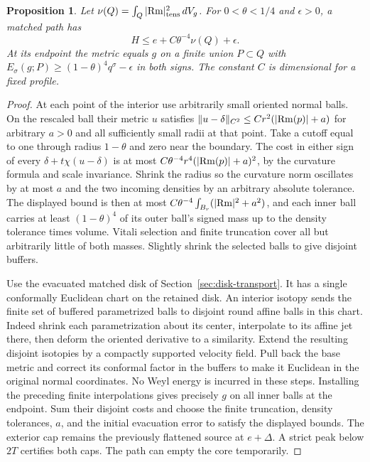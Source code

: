 \documentclass[11pt,letterpaper]{article}
\numberwithin{equation}{section}
\newtheorem{proposition}{Proposition}[section]
\begin{document}
\begin{proposition}\label{prop:core-subballs}
Let \(\nu(Q)=\int_Q|{\rm Rm}|^2_{\rm tens}\,dV_g\).
For \(0<\theta<1/4\) and \(\epsilon>0\), a matched path has
\[
 H\le e+C\theta^{-4}\nu(Q)+\epsilon .
\]
At its endpoint the metric equals \(g\) on a finite union
\(P\subset Q\) with \(E_\sigma(g;P)\ge(1-\theta)^4q^\sigma-\epsilon\)
in both signs. The constant \(C\) is dimensional for a fixed profile.
\end{proposition}
\begin{proof}
At each point of the interior use arbitrarily small oriented normal
balls. On the rescaled ball their metric \(u\)
satisfies \(\|u-\delta\|_{C^2}\le C r^2(|{\rm Rm}(p)|+a)\) for
arbitrary \(a>0\) and all sufficiently small radii at that point.
Take a cutoff equal to one through radius \(1-\theta\) and zero
near the boundary. The cost in either sign of every
\(\delta+t\chi(u-\delta)\) is at most
\(C\theta^{-4}r^4(|{\rm Rm}(p)|+a)^2\), by the curvature formula
and scale invariance. Shrink the radius so the curvature norm
oscillates by at most \(a\) and the two incoming densities by an
arbitrary absolute tolerance. The displayed bound is then at most
\(C\theta^{-4}\int_{B_r}(|{\rm Rm}|^2+a^2)\), and each inner
ball carries at least \((1-\theta)^4\) of its outer ball's signed
mass up to the density tolerance times volume. Vitali selection
and finite truncation cover all but arbitrarily little of both
masses. Slightly shrink the selected balls to give disjoint buffers.

Use the evacuated matched disk of Section~\ref{sec:disk-transport}.
It has a single conformally Euclidean chart on the retained disk.
An interior isotopy sends the finite set of buffered parametrized
balls to disjoint round affine balls in this chart. Indeed shrink
each parametrization about its center, interpolate to its affine
jet there, then deform the oriented derivative to a similarity.
Extend the resulting disjoint isotopies by a compactly supported
velocity field. Pull back the base metric and correct its conformal
factor in the buffers to make it Euclidean in the original normal
coordinates. No Weyl energy is incurred in these steps.
Installing the preceding finite interpolations gives precisely \(g\)
on all inner balls at the endpoint. Sum their disjoint costs and
choose the finite truncation, density tolerances, \(a\), and the
initial evacuation error to satisfy the displayed bounds. The
exterior cap remains the previously flattened source at \(e+\Delta\).
A strict peak below \(2T\) certifies both caps. The path can empty
the core temporarily.
\end{proof}
\end{document}
